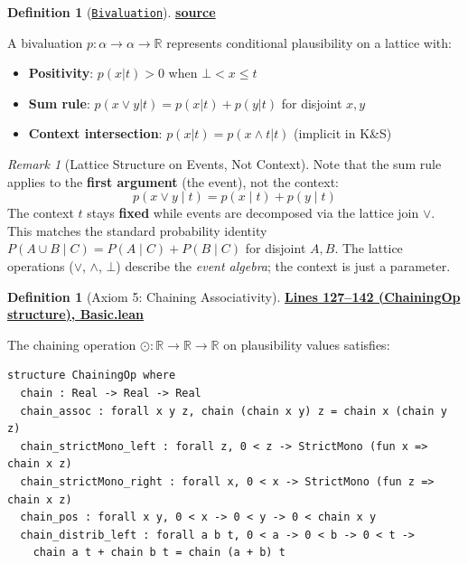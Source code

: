 \documentclass[11pt]{article}
\theoremstyle{definition}
\newtheorem{definition}[theorem]{Definition}
\theoremstyle{remark}
\newtheorem{remark}[theorem]{Remark}
\begin{document}
\begin{definition}[\href{https://github.com/zariuq/ks-foundations-of-inference/blob/main/KnuthSkilling/Probability/ConditionalProbability/Basic.lean}{\texttt{Bivaluation}}]
\textbf{\href{https://github.com/zariuq/ks-foundations-of-inference/blob/main/KnuthSkilling/Probability/ConditionalProbability/Basic.lean}{source}}

A bivaluation $p : \alpha \to \alpha \to \mathbb{R}$ represents conditional plausibility on a lattice with:
\begin{itemize}
\item \textbf{Positivity}: $p(x|t) > 0$ when $\bot < x \leq t$
\item \textbf{Sum rule}: $p(x \vee y|t) = p(x|t) + p(y|t)$ for disjoint $x, y$
\item \textbf{Context intersection}: $p(x|t) = p(x \wedge t|t)$ (implicit in K\&S)
\end{itemize}
\end{definition}

\begin{remark}[Lattice Structure on Events, Not Context]
Note that the sum rule applies to the \textbf{first argument} (the event), not the context:
\[ p(x \vee y \mid t) = p(x \mid t) + p(y \mid t) \]
The context $t$ stays \textbf{fixed} while events are decomposed via the lattice join $\vee$.
This matches the standard probability identity $P(A \cup B \mid C) = P(A \mid C) + P(B \mid C)$ for disjoint $A, B$.
The lattice operations ($\vee$, $\wedge$, $\bot$) describe the \emph{event algebra}; the context is just a parameter.
\end{remark}

\begin{definition}[Axiom 5: Chaining Associativity]
\textbf{\href{https://github.com/zariuq/ks-foundations-of-inference/blob/main/KnuthSkilling/Probability/ConditionalProbability/Basic.lean}{Lines 127--142 (ChainingOp structure), Basic.lean}}

The chaining operation $\odot : \mathbb{R} \to \mathbb{R} \to \mathbb{R}$ on plausibility values satisfies:
\end{definition}

\begin{lstlisting}[caption={\texttt{ChainingOp} structure (\href{https://github.com/zariuq/ks-foundations-of-inference/blob/main/KnuthSkilling/Probability/ConditionalProbability/Basic.lean}{Basic.lean})},numbers=none]
structure ChainingOp where
  chain : Real -> Real -> Real
  chain_assoc : forall x y z, chain (chain x y) z = chain x (chain y z)
  chain_strictMono_left : forall z, 0 < z -> StrictMono (fun x => chain x z)
  chain_strictMono_right : forall x, 0 < x -> StrictMono (fun z => chain x z)
  chain_pos : forall x y, 0 < x -> 0 < y -> 0 < chain x y
  chain_distrib_left : forall a b t, 0 < a -> 0 < b -> 0 < t ->
    chain a t + chain b t = chain (a + b) t
\end{lstlisting}
\end{document}
